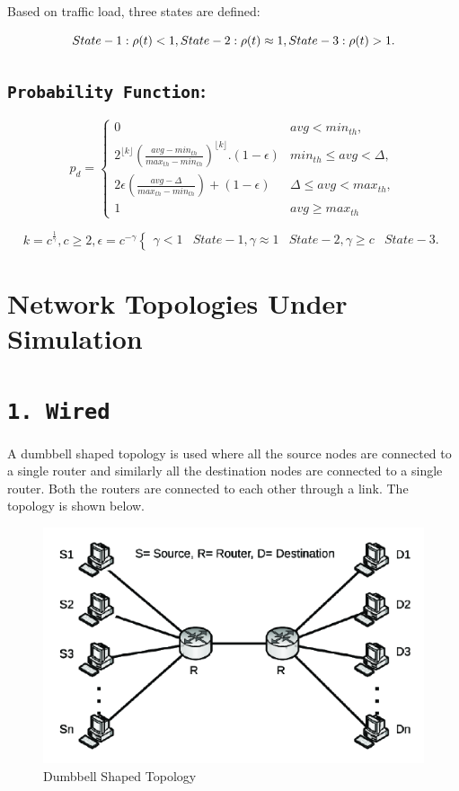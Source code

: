 \documentclass[10pt]{report}
\begin{document}
Based on traffic load, three states are defined:

$$
  State-1: \rho(t) < 1, \\
  State-2: \rho(t) \approx 1,\\
  State-3: \rho(t) > 1. 
$$

\subsection*{\textbf{\texttt{Probability Function}}:}
$$
  p_d = \begin{cases}
        0 & avg < min_{th},\\
        2^{\lfloor k \rfloor}(\frac{avg-min_{th}}{max_{th}-min_{th}})^{\lfloor k\rfloor}.(1-\epsilon) & min_{th} \leq avg \lt \Delta, \\
        2\epsilon(\frac{avg-\Delta}{max_{th}-min_{th}}) + (1-\epsilon) & \Delta \leq avg \lt max_{th}, \\
        1 & avg \geq max_{th}
        \end{cases}
$$

$$
  k = c^{\frac{1}{\gamma}}, c \geq 2, 
  \epsilon = c^{-\gamma}
  \begin{cases}
        \gamma \lt 1 & State-1,
        \gamma \approx 1 & State-2,
        \gamma \geq c & State-3.
        \end{cases}
$$

\section*{Network Topologies Under Simulation}

\section*{\textbf{\texttt{1. Wired}}}
A dumbbell shaped topology is used where all the source nodes are connected to a single router and similarly all the destination nodes are connected to a single router. Both the routers are connected to each other through a link. The topology is shown below.

\begin{figure}
    \centering
    \includegraphics[scale=0.7]{static/images/wired_dumbbell_topology.png}
    \caption{Dumbbell Shaped Topology}
    \label{fig:dumbbell_topology}
\end{figure}
\end{document}
